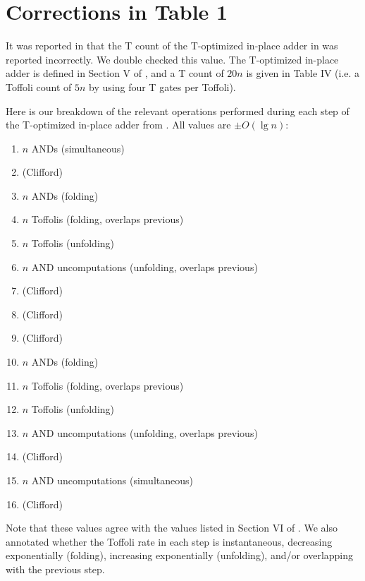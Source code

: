 \documentclass[onecolumn,unpublished]{quantumarticle}
\theoremstyle{definition}
\theoremstyle{definition}
\theoremstyle{definition}
\begin{document}



\appendix

\section{Corrections in Table 1}
\label{app:correction}

It was reported in \cite{oonishi2020efficient} that the T count of the T-optimized in-place adder in \cite{thapliyal2020lookahead} was reported incorrectly.
We double checked this value.
The T-optimized in-place adder is defined in Section V of \cite{thapliyal2020lookahead}, and a T count of $20n$ is given in Table IV (i.e. a Toffoli count of $5n$ by using four T gates per Toffoli).

Here is our breakdown of the relevant operations performed during each step of the T-optimized in-place adder from \cite{thapliyal2020lookahead}.
All values are $\pm O(\lg n)$:

\begin{enumerate}
    \item $n$ ANDs (simultaneous)
    \item (Clifford)
    \item $n$ ANDs (folding)
    \item $n$ Toffolis (folding, overlaps previous)
    \item $n$ Toffolis (unfolding)
    \item $n$ AND uncomputations (unfolding, overlaps previous)
    \item (Clifford)
    \item (Clifford)
    \item (Clifford)
    \item $n$ ANDs (folding)
    \item $n$ Toffolis (folding, overlaps previous)
    \item $n$ Toffolis (unfolding)
    \item $n$ AND uncomputations (unfolding, overlaps previous)
    \item (Clifford)
    \item $n$ AND uncomputations (simultaneous)
    \item (Clifford)
\end{enumerate}

Note that these values agree with the values listed in Section VI of \cite{thapliyal2020lookahead}.
We also annotated whether the Toffoli rate in each step is instantaneous, decreasing exponentially (folding), increasing exponentially (unfolding), and/or overlapping with the previous step.
\end{document}
